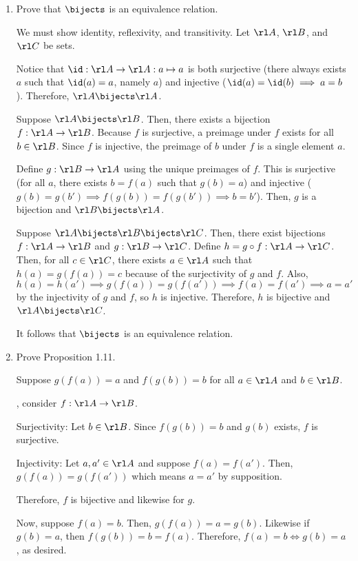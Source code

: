 \begin{xca}\end{xca}
\begin{enumerate}
  \item Prove that $\bijects$ is an equivalence relation.
        \begin{prf}
          We must show identity, reflexivity, and transitivity.
          Let $\rl A$, $\rl B$, and $\rl C$ be sets.

          Notice that $\id : \rl A \to \rl A : a \mapsto a$
          is both surjective (there always exists $a$ such that $\id(a) = a$, namely $a$)
          and injective ($\id(a) = \id(b) \implies a = b$).
          Therefore, $\rl A \bijects \rl A$.

          Suppose $\rl A \bijects \rl B$.
          Then, there exists a bijection $f : \rl A \to \rl B$.
          Because $f$ is surjective, a preimage under $f$ exists for all $b \in \rl B$.
          Since $f$ is injective, the preimage of $b$ under $f$ is a single element $a$.

          Define $g : \rl B \to \rl A$ using the unique preimages of $f$.
          This is surjective (for all $a$, there exists $b = f(a)$ such that $g(b) = a$)
          and injective ($g(b) = g(b') \implies f(g(b)) = f(g(b')) \implies b = b'$).
          Then, $g$ is a bijection and $\rl B \bijects \rl A$.

          Suppose $\rl A \bijects \rl B \bijects \rl C$.
          Then, there exist bijections $f : \rl A \to \rl B$ and $g : \rl B \to \rl C$.
          Define $h = g \circ f : \rl A \to \rl C$.
          Then, for all $c \in \rl C$, there exists $a \in \rl A$
          such that $h(a) = g(f(a)) = c$ because of the surjectivity of $g$ and $f$.
          Also, $h(a) = h(a') \implies g(f(a)) = g(f(a')) \implies f(a) = f(a') \implies a = a'$
          by the injectivity of $g$ and $f$, so $h$ is injective.
          Therefore, $h$ is bijective and $\rl A \bijects \rl C$.

          It follows that $\bijects$ is an equivalence relation.
        \end{prf}
  \item Prove Proposition 1.11.
        \begin{prf}
          Suppose $g(f(a)) = a$ and $f(g(b)) = b$ for all $a \in \rl A$ and $b \in \rl B$.

          \WLOG, consider $f : \rl A \to \rl B$.

          Surjectivity: Let $b \in \rl B$.
          Since $f(g(b)) = b$ and $g(b)$ exists, $f$ is surjective.

          Injectivity: Let $a, a' \in \rl A$ and suppose $f(a) = f(a')$.
          Then, $g(f(a)) = g(f(a'))$ which means $a = a'$ by supposition.

          Therefore, $f$ is bijective and likewise for $g$.

          Now, suppose $f(a) = b$. Then, $g(f(a)) = a = g(b)$.
          Likewise if $g(b) = a$, then $f(g(b)) = b = f(a)$.
          Therefore, $f(a) = b \iff g(b) = a$, as desired.
        \end{prf}
\end{enumerate}

